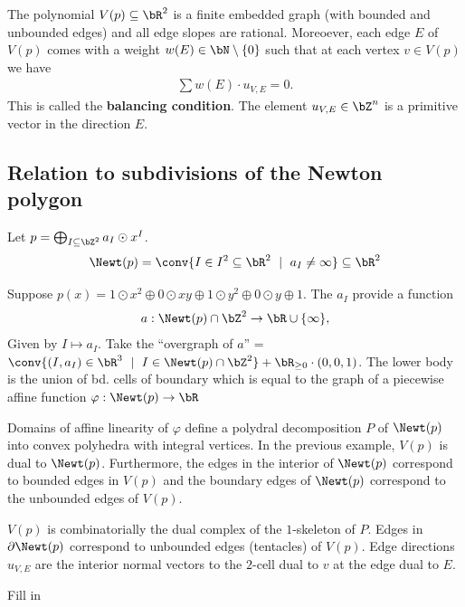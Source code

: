\begin{prop}\label{prop:finite-embedded-graph}
  The polynomial $V(p) \subseteq \bR^2$ is a finite embedded graph (with bounded and unbounded edges) and all edge slopes are rational. Moreoever, each edge $E$ of $V(p)$ comes with a weight $w(E) \in \bN\setminus \{0\}$ such that at each vertex $v \in V(p)$ we have
  \begin{align*}
    \sum w(E)\cdot u_{V,E} = 0.
  \end{align*}
  This is called the \textbf{balancing condition}. The element $u_{V,E} \in \bZ^n$ is a primitive vector in the direction $E$.
\end{prop}
\begin{example}\label{example:looking-closely-at-conic}
  
\end{example}
\subsection{Relation to subdivisions of the Newton polygon}
Let $p = \bigoplus_{I\subseteq \bZ^2} a_I \odot x^I$.
\begin{align*}
  \Newt(p) = \conv \{I\in I^2 \subseteq \bR^2 ~\mid~ a_I \neq \infty\} \subseteq \bR^2
\end{align*}

\begin{example}\label{example:a-conic}
  Suppose $p(x) = 1\odot x^2 \oplus 0\odot xy\oplus 1\odot y^2 \oplus 0\odot y\oplus 1$. The $a_I$ provide a function 
  \begin{align*}
    a:\Newt(p) \cap \bZ^2 \to \bR \cup \{\infty\}, 
  \end{align*}
  Given by $I\mapsto a_I$. Take the ``overgraph of $a$'' = $\conv\{(I,a_I) \in \bR^3~\mid~ I\in \Newt(p) \cap \bZ^2\} + \bR_{\geq 0}\cdot (0,0,1)$. The lower body is the union of bd. cells of boundary which is equal to the graph of a piecewise affine function $\varphi:\Newt(p) \to \bR$
\end{example}

Domains of affine linearity of $\varphi$ define a polydral decomposition $P$ of $\Newt(p)$ into convex polyhedra with integral vertices. In the previous example, $V(p)$ is dual to $\Newt(p)$. Furthermore, the edges in the interior of $\Newt(p)$ correspond to bounded edges in $V(p)$ and the boundary edges of $\Newt(p)$ correspond to the unbounded edges of $V(p)$.

\begin{prop}\label{prop:newton-to-tropical-hypersurface}
  $V(p)$ is combinatorially the dual complex of the $1$-skeleton of $P$. Edges in $\partial \Newt(p)$ correspond to unbounded edges (tentacles) of $V(p)$. Edge directions $u_{V,E}$ are the interior normal vectors to the $2$-cell dual to $v$ at the edge dual to $E$.
\end{prop}
\begin{example}\label{example:biquadratic-curves}
  Fill in
\end{example}

